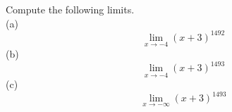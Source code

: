 Compute the following limits.\\
(a)
\begin{equation*}
  \lim_{x\rightarrow-4} (x+3)^{1492}
\end{equation*}
(b)
\begin{equation*}
  \lim_{x\rightarrow-4} (x+3)^{1493}
\end{equation*}
(c)
\begin{equation*}
  \lim_{x\rightarrow-\infty} (x+3)^{1493}
\end{equation*}
